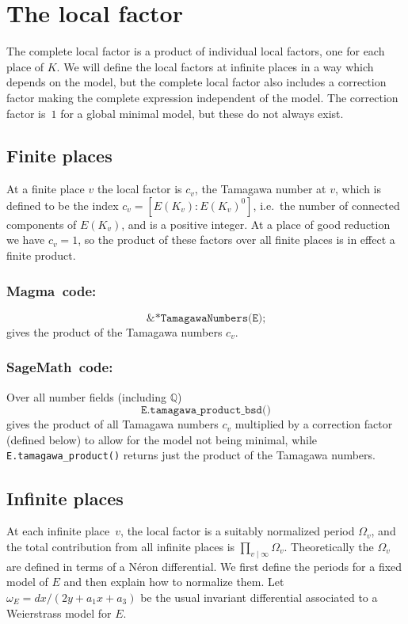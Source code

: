 \documentclass{amsart}
\newcommand{\software}[1]{\textsf{#1}} %
\newcommand{\Sage}{\software{SageMath}}
\newcommand{\Magma}{\software{Magma}{}}
\newcommand\Q{\mathbb{Q}}
\begin{document}
\section{The local factor}\label{local-factors}

The complete local factor is a product of individual local factors,
one for each place of \(K\). We will define the local factors at
infinite places in a way which depends on the model, but the complete
local factor also includes a correction factor making the complete
expression independent of the model.  The correction factor is~$1$ for
a global minimal model, but these do not always exist.

\subsection{Finite places}\label{at-finite-places}

At a finite place \(v\) the local factor is \(c_v\), the Tamagawa
number at \(v\), which is defined to be the index \(c_v =
[E(K_v):E(K_v)^0]\), i.e.~the number of connected components of
\(E(K_v)\), and is a positive integer. At a place of good reduction we
have \(c_v=1\), so the product of these factors over all finite places
is in effect a finite product.

\subsubsection{\Magma\ code:}\label{magma-4}

\[
\texttt{\&*TamagawaNumbers(E);}
\]
gives the product of the Tamagawa numbers \(c_v\).

\subsubsection{\Sage\ code:}\label{sage-4}

Over all number fields (including \(\Q\))
\[
\texttt{E.tamagawa\_product\_bsd()}
\]
gives the product of all Tamagawa numbers \(c_v\) multiplied by a
correction factor (defined below) to allow for the model not being
minimal, while \texttt{E.tamagawa\_product()} returns just the product
of the Tamagawa numbers.

\subsection{Infinite places}\label{at-infinite-places}

At each infinite place~$v$, the local factor is a suitably normalized period
\(\Omega_v\), and the total contribution from all infinite places is
\(\prod_{v\mid\infty}\Omega_v\). Theoretically the \(\Omega_v\) are
defined in terms of a N\'eron differential. We first define the periods
for a fixed model of \(E\) and then explain how to normalize them. Let
\(\omega_E = dx/(2y+a_1x+a_3)\) be the usual invariant differential
associated to a Weierstrass model for \(E\).
\end{document}
